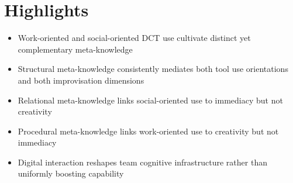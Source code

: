 \documentclass[12pt]{article}
\begin{document}
\thispagestyle{empty}

\section*{Highlights}

\begin{itemize}[leftmargin=*, itemsep=6pt]
\item Work-oriented and social-oriented DCT use cultivate distinct yet complementary meta-knowledge
\item Structural meta-knowledge consistently mediates both tool use orientations and both improvisation dimensions
\item Relational meta-knowledge links social-oriented use to immediacy but not creativity
\item Procedural meta-knowledge links work-oriented use to creativity but not immediacy
\item Digital interaction reshapes team cognitive infrastructure rather than uniformly boosting capability
\end{itemize}
\end{document}

